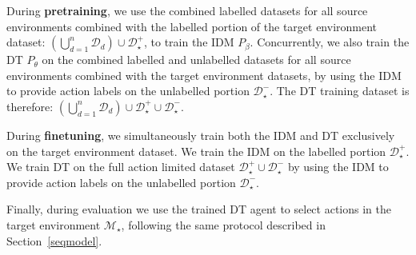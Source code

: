 \documentclass{article} %
\begin{document}
During \textbf{pretraining}, we use the combined labelled datasets for all source environments combined with the labelled portion of the target environment dataset: $\left(\bigcup_{d=1}^n \mathcal{D}_d\right) \cup \mathcal{D}^+_\star$, to train the IDM $P_\beta$. Concurrently, we also train the DT $P_\theta$ on the combined labelled and unlabelled datasets for all source environments combined with the target environment datasets, by using the IDM to provide action labels on the unlabelled portion $\mathcal{D}^-_\star$.  The DT training dataset is therefore: $\left(\bigcup_{d=1}^n \mathcal{D}_d\right) \cup \mathcal{D}^+_\star \cup \mathcal{D}^-_\star$.

During \textbf{finetuning}, we simultaneously train both the IDM and DT exclusively on the target environment dataset. We train the IDM on the labelled portion $\mathcal{D}^+_\star$. We train DT on the full action limited dataset $\mathcal{D}^+_\star\cup\mathcal{D}^-_\star$ by using the IDM to provide action labels on the unlabelled portion $\mathcal{D}^-_\star$.

Finally, during evaluation we use the trained DT agent to select actions in the target environment $\mathcal{M}_\star$, following the same protocol described in Section~\ref{seqmodel}.

\end{document}
